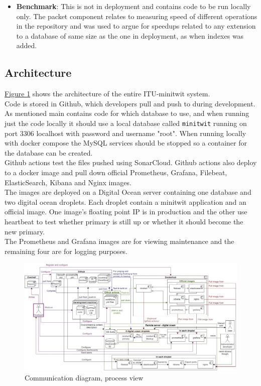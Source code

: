 \begin{itemize}
    \item \textbf{Benchmark}: This is not in deployment and contains code to be run locally only. The packet component relates to measuring speed of different operations in the repository and was used to argue for speedups related to any extension to a database of same size as the one in deployment, as when indexes was added.
\end{itemize}


\subsection{Architecture} %
\hyperref[fig:componentDiagram]{Figure \ref{fig:communicationDiagram}} shows the architecture of the entire ITU-minitwit system.\\
Code is stored in Github, which developers pull and push to during development. As mentioned main contains code for which database to use, and when running just the code locally it should use a local database called \texttt{minitwit} running on port 3306 localhost with password and username "root". When running locally with docker compose the MySQL services should be stopped so a container for the database can be created.\\
Github actions test the files pushed using SonarCloud. Github actions also deploy to a docker image and pull down official Prometheus, Grafana, Filebeat, ElasticSearch, Kibana and Nginx images.\\
The images are deployed on a Digital Ocean server containing one database and two digital ocean droplets. Each droplet contain a minitwit application and an official image. One image's floating point IP is in production and the other use heartbeat to test whether primary is still up or whether it should become the new primary.
\\
The Prometheus and Grafana images are for viewing maintenance and the remaining four are for logging purposes.




\begin{figure}[H]
    \centering
    \hspace*{-1.5in}
    \includegraphics[width=1.6\textwidth]{images/Diagrams-Process_view_communication_diagram.jpg}
    \caption{Communication diagram, process view}
    \label{fig:communicationDiagram}
\end{figure}





